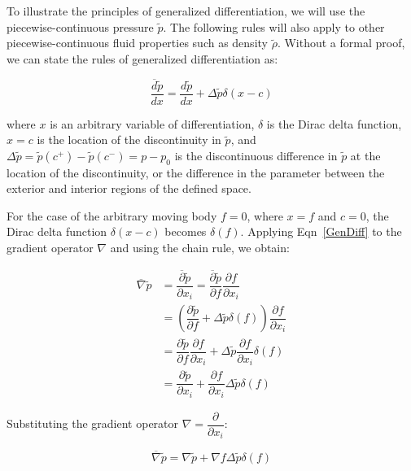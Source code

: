 \documentclass[]{aiaa-tc}%
\begin{document}
To illustrate the principles of generalized differentiation, we will use the piecewise-continuous pressure $\widetilde{p}$.  The following rules will also apply to other piecewise-continuous fluid properties such as density $\widetilde{\rho}$. Without a formal proof, we can state the rules of generalized differentiation as:

\begin{equation} \label{GenDiff}
\dfrac{\overline{d}\widetilde{p}}{dx}
    = \dfrac{d\widetilde{p}}{dx} + \Delta\widetilde{p} \delta(x - c)
\end{equation}

\noindent where $x$ is an arbitrary variable of differentiation, $\delta$ is the Dirac delta function, $x=c$ is the location of the discontinuity in $\widetilde{p}$, and $\Delta\widetilde{p}=\widetilde{p}(c^+)-\widetilde{p}(c^-)=p - p_0$ is the discontinuous difference in $\widetilde{p}$ at the location of the discontinuity, or the difference in the parameter between the exterior and interior regions of the defined space.

For the case of the arbitrary moving body $f=0$, where $x=f$ and $c=0$, the Dirac delta function $\delta(x-c)$ becomes $\delta(f)$.  Applying Eqn~\ref{GenDiff} to the gradient operator $\nabla$ and using the chain rule, we obtain:

\begin{align*}
\overline{\nabla} \widetilde{p}
&= \dfrac{\overline{\partial}\widetilde{p}}{\partial x_i}
= \dfrac{\overline{\partial}\widetilde{p}}{\partial f}
    \dfrac{\partial f}{\partial x_i} \\
&= \left( \dfrac{\partial\widetilde{p}}{\partial f}
    + \Delta \widetilde{p} \delta(f) \right)
    \dfrac{\partial f}{\partial x_i} \\
&= \dfrac{\partial\widetilde{p}}{\partial f} \dfrac{\partial f}{\partial x_i}
    + \Delta \widetilde{p} \dfrac{\partial f}{\partial x_i} \delta(f) \\
&= \dfrac{\partial\widetilde{p}}{\partial x_i}
    + \dfrac{\partial f}{\partial x_i} \Delta \widetilde{p} \delta(f)
\end{align*}

\noindent Substituting the gradient operator $\nabla = \dfrac{\partial}{\partial x_i}$:

\begin{equation} \label{GenGrad}
\overline{\nabla} \widetilde{p}
= \nabla\widetilde{p} + \nabla f \Delta\widetilde{p} \delta(f)
\end{equation}
\end{document}
